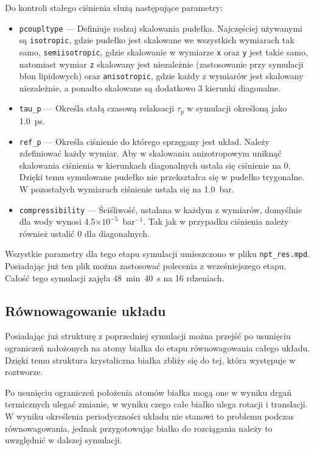 Do kontroli stałego ciśnienia służą następujące parametry:
\begin{itemize}
\item \texttt{pcoupltype} --- Definiuje rodzaj skalowania pudełka. Najczęściej używanymi są \texttt{isotropic}, gdzie pudełko jest skalowane we wszystkich wymiarach tak samo, \texttt{semiisotropic}, gdzie skalowanie w wymiarze \texttt{x} oraz \texttt{y} jest takie samo, natomiast wymiar \texttt{z} skalowany jest niezależnie (zastosowanie przy symulacji błon lipidowych) oraz \texttt{anisotropic}, gdzie każdy z wymiarów jest skalowany niezależnie, a ponadto skalowane są dodatkowo 3 kierunki diagonalne.
\item \texttt{tau\_p} --- Określa stałą czasową relaksacji $\tau_{p}$ w symulacji określoną jako 1.0~ps.
\item \texttt{ref\_p} --- Określa ciśnienie do którego sprzęgany jest układ. Należy zdefiniować każdy wymiar. Aby w skalowaniu anizotropowym uniknąć skalowania ciśnienia w kierunkach diagonalnych ustala się ciśnienie na 0. Dzięki temu symulowane pudełko nie przekształca się w pudełko trygonalne. W pozostałych wymiarach ciśnienie ustala się na 1.0~bar.
\item \texttt{compressibility} --- Ściśliwość, ustalana w każdym z wymiarów, domyślnie dla wody wynosi 4.5$\times10^{-5}$~bar$^{-1}$. Tak jak w przypadku ciśnienia należy również ustalić 0 dla diagonalnych.
\end{itemize}

Wszystkie parametry dla tego etapu symulacji umieszczono w pliku \texttt{npt\_res.mpd}. Posiadając już ten plik można zastosować polecenia z wcześniejszego etapu. Całość tego symulacji zajęła 48~min~40~s na 16 rdzeniach. 

\subsection{Równowagowanie układu}

Posiadając już strukturę z poprzedniej symulacji można przejść po usunięciu ograniczeń nałożonych na atomy białka do etapu równowagowania całego układu. Dzięki temu struktura krystaliczna białka zbliży się do tej, która występuje w roztworze. 

Po usunięciu ograniczeń położenia atomów białka mogą one w wyniku drgań termicznych ulegać zmianie, w wyniku czego całe białko ulega rotacji i translacji. W wyniku określenia periodyczności układu nie stanowi to problemu podczas równowagowania, jednak przygotowując białko do rozciągania należy to uwzględnić w dalszej symulacji.

